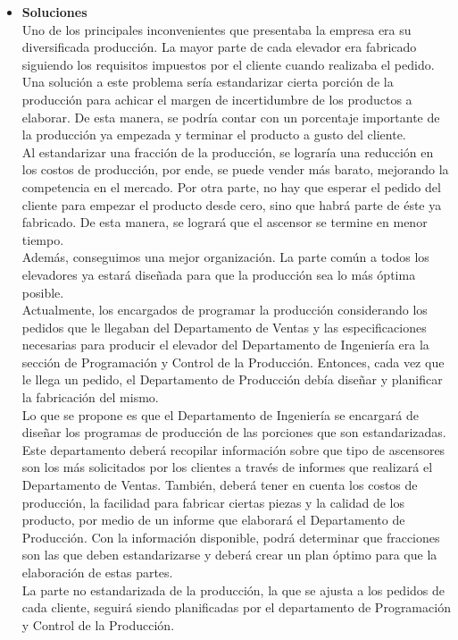 \documentclass[a4paper,10pt,titlepage]{article}
\begin{document}
\begin{itemize}
 \item \textbf{Soluciones}\\
Uno de los principales inconvenientes que presentaba la empresa era su diversificada producción. La  mayor parte de cada elevador era fabricado siguiendo los requisitos impuestos por el cliente cuando realizaba el pedido. Una solución a este problema sería estandarizar cierta porción de la producción para achicar el margen de incertidumbre de los productos a elaborar. De esta manera, se podría contar con un porcentaje importante de la producción ya empezada y terminar el producto a gusto del cliente. \\
Al estandarizar una fracción de la producción, se lograría una reducción en los costos de producción, por ende, se puede vender más barato, mejorando la competencia en el mercado. Por otra parte, no hay que esperar el pedido del cliente para empezar el producto desde cero, sino que habrá parte de éste ya fabricado. De esta manera, se logrará que el ascensor se termine en menor tiempo. \\
Además, conseguimos una mejor organización. La parte común a todos los elevadores ya estará diseñada para que la producción sea lo más óptima posible. \\
Actualmente, los encargados de programar la producción considerando los pedidos que le llegaban del Departamento de Ventas y las especificaciones necesarias para producir el elevador del Departamento de Ingeniería era la sección de Programación y Control de la Producción. Entonces, cada vez que le llega un pedido, el Departamento de Producción debía diseñar y planificar la fabricación del mismo.\\
Lo que se propone es que el Departamento de Ingeniería se encargará de  diseñar los programas de producción de las porciones que son estandarizadas. Este departamento deberá recopilar información sobre que tipo de ascensores son los más solicitados por los clientes a través de informes que realizará el Departamento de Ventas. También, deberá tener en cuenta los costos de producción, la facilidad para fabricar ciertas piezas y la calidad de los producto, por medio de un informe que elaborará el Departamento de Producción. Con la información disponible, podrá determinar que fracciones son las que deben estandarizarse y deberá crear un plan óptimo para que la elaboración de estas partes. \\
La parte no estandarizada de la producción, la que se ajusta a los pedidos de cada cliente, seguirá siendo planificadas por el departamento de Programación y Control de la Producción.\\

\end{itemize}
\end{document}
